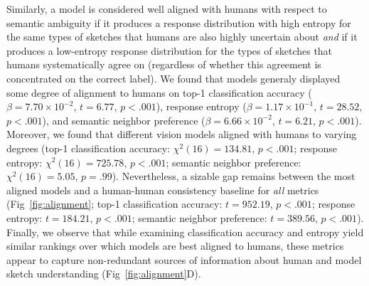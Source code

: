 \documentclass{article}
\begin{document}
Similarly, a model is considered well aligned with humans with respect to semantic ambiguity if it produces a response distribution with high entropy for the same types of sketches that humans are also highly uncertain about \textit{and} if it produces a low-entropy response distribution for the types of sketches that humans systematically agree on (regardless of whether this agreement is concentrated on the correct label).
We found that models generaly displayed some degree of alignment to humans on top-1 classification accuracy ($\beta= 7.70\times10^{-2}$, $t=6.77$, $p<.001$), response entropy ($\beta=1.17\times10^{-1}$, $t=28.52$, $p<.001$), and semantic neighbor preference ($\beta = 6.66\times10^{-2}$, $t = 6.21$, $p<.001$). 
Moreover, we found that different vision models aligned with humans to varying degrees (top-1 classification accuracy: $\chi^2(16) = 134.81$, $p<.001$; response entropy: $\chi^2(16) = 725.78$, $p<.001$; semantic neighbor preference: $\chi^2(16) = 5.05$, $p=.99$).
Nevertheless, a sizable gap remains between the most aligned models and a human-human consistency baseline for \textit{all} metrics (Fig~\ref{fig:alignment}; top-1 classification accuracy: $t = 952.19$, $p<.001$; response entropy: $t = 184.21$, $p<.001$; semantic neighbor preference: $t=389.56$, $p<.001$).
Finally, we observe that while examining classification accuracy and entropy yield similar rankings over which models are best aligned to humans, these metrics appear to capture non-redundant sources of information about human and model sketch understanding (Fig~\ref{fig:alignment}D).
\end{document}
